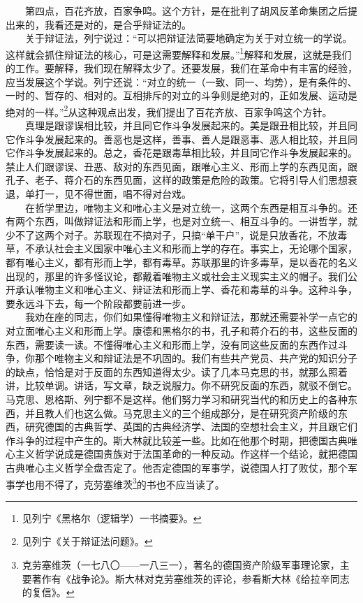 \documentclass[cn,11pt,chinese]{elegantbook}
\begin{document}
　　第四点，百花齐放，百家争鸣。这个方针，是在批判了胡风反革命集团之后提出来的，我看还是对的，是合乎辩证法的。\\
　　关于辩证法，列宁说过：“可以把辩证法简要地确定为关于对立统一的学说。这样就会抓住辩证法的核心，可是这需要解释和发展。”\footnote[2]{ 见列宁《黑格尔（逻辑学）一书摘要》。}解释和发展，这就是我们的工作。要解释，我们现在解释太少了。还要发展，我们在革命中有丰富的经验，应当发展这个学说。列宁还说：“对立的统一（一致、同一、均势），是有条件的、一时的、暂存的、相对的。互相排斥的对立的斗争则是绝对的，正如发展、运动是绝对的一样。”\footnote[3]{ 见列宁《关于辩证法问题》。}从这种观点出发，我们提出了百花齐放、百家争鸣这个方针。\\
　　真理是跟谬误相比较，并且同它作斗争发展起来的。美是跟丑相比较，并且同它作斗争发展起来的。善恶也是这样，善事、善人是跟恶事、恶人相比较，并且同它作斗争发展起来的。总之，香花是跟毒草相比较，并且同它作斗争发展起来的。禁止人们跟谬误、丑恶、敌对的东西见面，跟唯心主义、形而上学的东西见面，跟孔子、老子、蒋介石的东西见面，这样的政策是危险的政策。它将引导人们思想衰退，单打一，见不得世面，唱不得对台戏。\\
　　在哲学里边，唯物主义和唯心主义是对立统一，这两个东西是相互斗争的。还有两个东西，叫做辩证法和形而上学，也是对立统一、相互斗争的。一讲哲学，就少不了这两个对子。苏联现在不搞对子，只搞“单干户”，说是只放香花，不放毒草，不承认社会主义国家中唯心主义和形而上学的存在。事实上，无论哪个国家，都有唯心主义，都有形而上学，都有毒草。苏联那里的许多毒草，是以香花的名义出现的，那里的许多怪议论，都戴着唯物主义或社会主义现实主义的帽子。我们公开承认唯物主义和唯心主义、辩证法和形而上学、香花和毒草的斗争。这种斗争，要永远斗下去，每一个阶段都要前进一步。\\
　　我劝在座的同志，你们如果懂得唯物主义和辩证法，那就还需要补学一点它的对立面唯心主义和形而上学。康德和黑格尔的书，孔子和蒋介石的书，这些反面的东西，需要读一读。不懂得唯心主义和形而上学，没有同这些反面的东西作过斗争，你那个唯物主义和辩证法是不巩固的。我们有些共产党员、共产党的知识分子的缺点，恰恰是对于反面的东西知道得太少。读了几本马克思的书，就那么照着讲，比较单调。讲话，写文章，缺乏说服力。你不研究反面的东西，就驳不倒它。马克思、恩格斯、列宁都不是这样。他们努力学习和研究当代的和历史上的各种东西，并且教人们也这么做。马克思主义的三个组成部分，是在研究资产阶级的东西，研究德国的古典哲学、英国的古典经济学、法国的空想社会主义，并且跟它们作斗争的过程中产生的。斯大林就比较差一些。比如在他那个时期，把德国古典唯心主义哲学说成是德国贵族对于法国革命的一种反动。作这样一个结论，就把德国古典唯心主义哲学全盘否定了。他否定德国的军事学，说德国人打了败仗，那个军事学也用不得了，克劳塞维茨\footnote[4]{ 克劳塞维茨（一七八〇——一八三一），著名的德国资产阶级军事理论家，主要著作有《战争论》。斯大林对克劳塞维茨的评论，参看斯大林《给拉辛同志的复信》。}的书也不应当读了。\\
\end{document}
